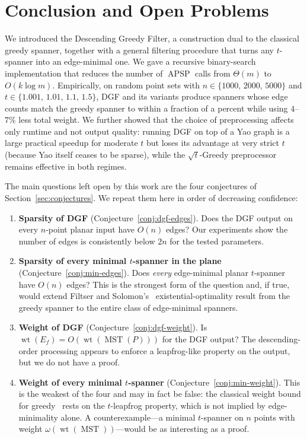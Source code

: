 \documentclass{article}
\DeclareMathOperator{\wt}{wt}
\DeclareMathOperator{\MST}{MST}
\DeclareMathOperator{\APSP}{APSP}
\begin{document}
\section{Conclusion and Open Problems}
\label{sec:open-problems}

We introduced the Descending Greedy Filter, a construction dual to the
classical greedy spanner, together with a general filtering procedure
that turns any $t$-spanner into an edge-minimal one. We gave a
recursive binary-search implementation that reduces the number of
$\APSP$ calls from $\Theta(m)$ to $O(k\log m)$. Empirically, on random
point sets with $n\in\{1000,\,2000,\,5000\}$ and
$t\in\{1.001,\,1.01,\,1.1,\,1.5\}$, DGF and its variants produce
spanners whose edge counts match the greedy spanner to within a
fraction of a percent while using $4$--$7\%$ less total weight. We
further showed that the choice of preprocessing affects only runtime
and not output quality: running DGF on top of a Yao graph is a large
practical speedup for moderate $t$ but loses its advantage at very
strict $t$ (because Yao itself ceases to be sparse), while the
$\sqrt{t}$-Greedy preprocessor remains effective in both regimes.

The main questions left open by this work are the four conjectures of
Section~\ref{sec:conjectures}. We repeat them here in order of
decreasing confidence:

\begin{enumerate}
  \item \textbf{Sparsity of DGF}
        (Conjecture~\ref{conj:dgf-edges}). Does the DGF output on every
        $n$-point planar input have $O(n)$ edges? Our experiments show
        the number of edges is consistently below $2n$ for the tested
        parameters.
  \item \textbf{Sparsity of every minimal $t$-spanner in the plane}
        (Conjecture~\ref{conj:min-edges}). Does \emph{every} edge-minimal
        planar $t$-spanner have $O(n)$ edges? This is the strongest
        form of the question and, if true, would extend Filtser and
        Solomon's~\cite{FS20} existential-optimality result from the
        greedy spanner to the entire class of edge-minimal spanners.
  \item \textbf{Weight of DGF}
        (Conjecture~\ref{conj:dgf-weight}). Is
        $\wt(E_f) = O(\wt(\MST(P)))$ for the DGF output? The
        descending-order processing appears to enforce a
        leapfrog-like property on the output, but we do not have a
        proof.
  \item \textbf{Weight of every minimal $t$-spanner}
        (Conjecture~\ref{conj:min-weight}). This is the weakest of the
        four and may in fact be false: the classical weight bound for
        greedy~\cite{CDNS95,DHN93,DNS95} rests on the $t$-leapfrog
        property, which is not implied by edge-minimality alone. A
        counterexample---a minimal $t$-spanner on $n$ points with
        weight $\omega(\wt(\MST))$---would be as interesting as a
        proof.
\end{enumerate}
\end{document}
